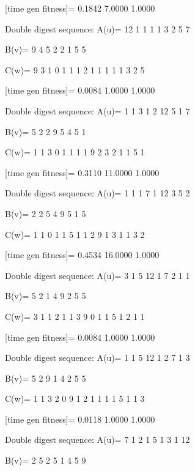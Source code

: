 [time gen fitness]=
    0.1842    7.0000    1.0000

Double digest sequence:
A(u)=
    12     1     1     1     1     3     2     5     7

B(v)=
     9     4     5     2     2     1     5     5

C(w)=
     9     3     1     0     1     1     1     2     1     1     1     1     1     3     2     5

[time gen fitness]=
    0.0084    1.0000    1.0000

Double digest sequence:
A(u)=
     1     1     3     1     2    12     5     1     7

B(v)=
     5     2     2     9     5     4     5     1

C(w)=
     1     1     3     0     1     1     1     1     9     2     3     2     1     1     5     1

[time gen fitness]=
    0.3110   11.0000    1.0000

Double digest sequence:
A(u)=
     1     1     1     7     1    12     3     5     2

B(v)=
     2     2     5     4     9     5     1     5

C(w)=
     1     1     0     1     1     5     1     1     2     9     1     3     1     1     3     2

[time gen fitness]=
    0.4534   16.0000    1.0000

Double digest sequence:
A(u)=
     3     1     5    12     1     7     2     1     1

B(v)=
     5     2     1     4     9     2     5     5

C(w)=
     3     1     1     2     1     1     3     9     0     1     1     5     1     2     1     1

[time gen fitness]=
    0.0084    1.0000    1.0000

Double digest sequence:
A(u)=
     1     1     5    12     1     2     7     1     3

B(v)=
     5     2     9     1     4     2     5     5

C(w)=
     1     1     3     2     0     9     1     2     1     1     1     1     5     1     1     3

[time gen fitness]=
    0.0118    1.0000    1.0000

Double digest sequence:
A(u)=
     7     1     2     1     5     1     3     1    12

B(v)=
     2     5     2     5     1     4     5     9

